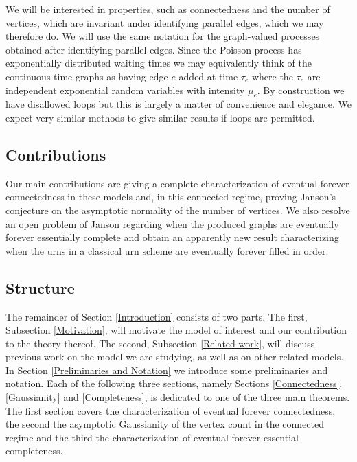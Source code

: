 \documentclass[12pt]{article}
\theoremstyle{definition}
\begin{document}
We will be interested in properties, such as connectedness and the number of vertices, which are invariant under identifying parallel edges, which we may therefore do. We will use the same notation for the graph-valued processes obtained after identifying parallel edges. Since the Poisson process has exponentially distributed waiting times we may equivalently think of the continuous time graphs as having edge $e$ added at time $\tau_e$ where the $\tau_e$ are independent exponential random variables with intensity $\mu_e$. By construction we have disallowed loops but this is largely a matter of convenience and elegance. We expect very similar methods to give similar results if loops are permitted.

\subsection{Contributions}

Our main contributions are giving a complete characterization of eventual forever connectedness in these models and, in this connected regime, proving Janson's \cite{janson_2017_on} conjecture on the asymptotic normality of the number of vertices. We also resolve an open problem of Janson \cite{janson_2017_on} regarding when the produced graphs are eventually forever essentially complete and obtain an apparently new result characterizing when the urns in a classical urn scheme \cite{benhamou_2017_concentration,hwang_2008_local,dutko_1989_central,karlin_1967_central,gnedin_2007_notes} are eventually forever filled in order.

\subsection{Structure} The remainder of Section \ref{Introduction} consists of two parts. The first, Subsection \ref{Motivation}, will motivate the model of interest and our contribution to the theory thereof. The second, Subsection \ref{Related work}, will discuss previous work on the model we are studying, as well as on other related models. In Section \ref{Preliminaries and Notation} we introduce some preliminaries and notation. Each of the following three sections, namely Sections \ref{Connectedness}, \ref{Gaussianity} and \ref{Completeness}, is dedicated to one of the three main theorems. The first section covers the characterization of eventual forever connectedness, the second the asymptotic Gaussianity of the vertex count in the connected regime and the third the characterization of eventual forever essential completeness.
\end{document}
